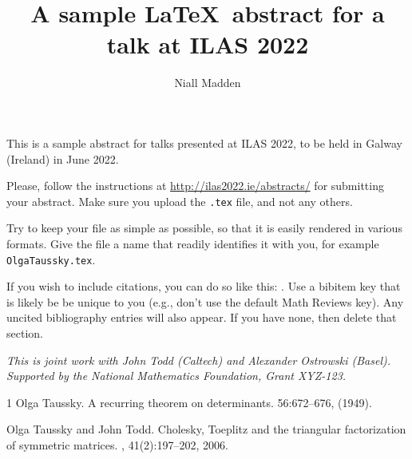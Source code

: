 \documentclass[a4paper]{amsart}
\date{}
\begin{document}
\title{A sample \LaTeX\ abstract for a talk at ILAS 2022}
\author{Niall Madden} %
\address{University of Wherever} %

\maketitle


This is a sample abstract for talks presented at ILAS 2022, to be held
in Galway (Ireland) in June 2022. 

Please, follow the instructions at \url{http://ilas2022.ie/abstracts/}
for submitting your abstract. Make sure you upload the \texttt{.tex}
file, and not any others. 

Try to keep your file as simple as possible, so that it is easily
rendered in various formats. Give the file a name that readily
identifies it with you, for example \texttt{OlgaTaussky.tex}. 

If you wish to include citations, you can do so like this:
\cite{my_key_for_OT49}. Use a bibitem key that is likely be be unique to
you (e.g., don't use the default Math Reviews key).
Any uncited bibliography entries will also
appear. If you have none, then delete that section.

\emph{This is joint work with John Todd (Caltech) and Alexander Ostrowski (Basel).
Supported by the National Mathematics Foundation, Grant XYZ-123.}

\begin{thebibliography}{1}
Olga Taussky.
\newblock A recurring theorem on determinants.
  56:672–676,  (1949).

Olga Taussky and John Todd.
\newblock Cholesky, Toeplitz and the triangular factorization of
symmetric matrices.
, 41(2):197--202, 2006.
\end{thebibliography}
\end{document}
